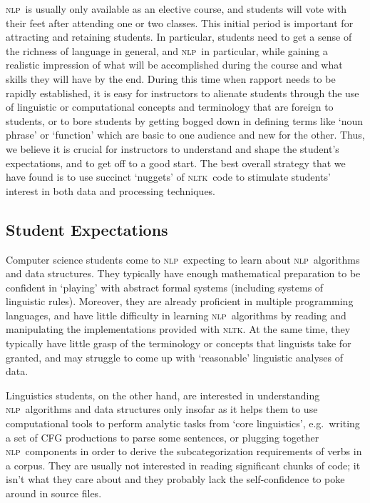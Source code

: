 \documentclass[11pt]{article}
\newcommand{\NLP}{\textsc{nlp}}
\newcommand{\NLTK}{\textsc{nltk}}
\begin{document}
\NLP\ is usually only available as an elective course, and students
will vote with their feet after attending one or two classes.  This
initial period is important for attracting and retaining students.  In
particular, students need to get a sense of the richness of language
in general, and \NLP\ in particular, while gaining a realistic
impression of what will be accomplished during the course and what
skills they will have by the end.  During this time when rapport needs
to be rapidly established, it is easy for instructors to alienate
students through the use of linguistic or computational concepts and
terminology that are foreign to students, or to bore students by
getting bogged down in defining terms like `noun phrase' or `function'
which are basic to one audience and new for the other.  Thus, we
believe it is crucial for instructors to understand and shape the
student's expectations, and to get off to a good start.  The best
overall strategy that we have found is to use succinct `nuggets' of
\NLTK\ code to stimulate students' interest in both data and
processing techniques.

\subsection{Student Expectations}

Computer science students come to \NLP\ expecting to learn about \NLP\
algorithms and data structures.  They typically have enough
mathematical preparation to be confident in `playing' with abstract
formal systems (including systems of linguistic rules).  Moreover,
they are already proficient in multiple programming languages, and
have little difficulty in learning \NLP\ algorithms by reading and
manipulating the implementations provided with \NLTK. At the same
time, they typically have little grasp of the terminology or concepts
that linguists take for granted, and may struggle to come up with
`reasonable' linguistic analyses of data.

Linguistics students, on the other hand, are interested in
understanding \NLP\ algorithms and data structures only insofar as it helps them
to use computational tools to perform analytic tasks from `core linguistics',
e.g.\ writing a set of CFG productions to parse some sentences, or
plugging together \NLP\ components in order to derive the subcategorization
requirements of verbs in a corpus.
They are usually not interested in reading significant chunks of code;
it isn't what they care about and they
probably lack the self-confidence to poke around in source files.
\end{document}
